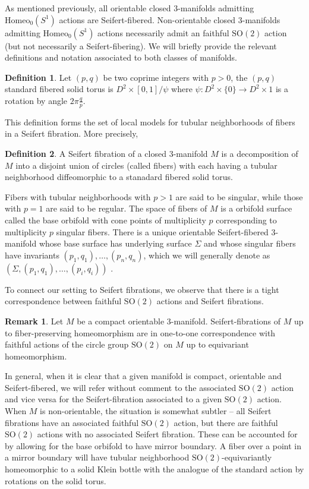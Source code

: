 \documentclass[10pt, oneside]{article}
\newcommand{\SO}[1][2]{\text{SO}(#1)}
\newcommand{\homeo}[1][S^1]{\text{Homeo}_0(#1)}
\theoremstyle{definition}
\newtheorem{defn}{Definition}[section]
\newtheorem{rem}{Remark}[section]
\theoremstyle{definition}
\begin{document}
As mentioned previously, all orientable closed 3-manifolds admitting $\homeo$ actions are Seifert-fibered. Non-orientable closed 3-manifolds admitting $\homeo$ actions necessarily admit an faithful $\SO$ action (but not necessarily a Seifert-fibering). We will briefly provide the relevant definitions and notation associated to both classes of manifolds.

\begin{defn}
    Let $(p, q)$ be two coprime integers with $p>0$, the $(p, q)$ standard fibered solid torus is $D^2\times [0, 1]/\psi$ where $\psi:D^2\times\{0\}\to D^2\times{1}$ is a rotation by angle $2\pi\frac{q}{p}$. 
\end{defn}

This definition forms the set of local models for tubular neighborhoods of fibers in a Seifert fibration. More precisely,

\begin{defn}
    A Seifert fibration of a closed 3-manifold $M$ is a decomposition of $M$ into a disjoint union of circles (called fibers) with each having a tubular neighborhood diffeomorphic to a stanadard fibered solid torus.
\end{defn}

Fibers with tubular neighborhoods with $p>1$ are said to be singular, while those with $p=1$ are said to be regular. The space of fibers of $M$ is a orbifold surface called the base orbifold with cone points of multiplicity $p$ corresponding to multiplicity $p$ singular fibers. There is a unique orientable Seifert-fibered 3-manifold whose base surface has underlying surface $\Sigma$ and whose singular fibers have invariants $(p_1, q_1),\dots,(p_n, q_n)$, which we will generally denote as $(\Sigma, (p_1, q_1),\dots,(p_i,q_i))$ \cite{martelli:IntroductionGeometric}.

To connect our setting to Seifert fibrations, we observe that there is a tight correspondence between faithful $\SO$ actions and Seifert fibrations.

\begin{rem}\label{rem:so2seifequiv}
    Let $M$ be a compact orientable 3-manifold. Seifert-fibrations of $M$ up to fiber-preserving homeomorphism are in one-to-one correspondence with faithful actions of the circle group $\SO$ on $M$ up to equivariant homeomorphism.
\end{rem}

In general, when it is clear that a given manifold is compact, orientable and Seifert-fibered, we will refer without comment to the associated $\SO$ action and vice versa for the Seifert-fibration associated to a given $\SO$ action. When $M$ is non-orientable, the situation is somewhat subtler -- all Seifert fibrations have an associated faithful $\SO$ action, but there are faithful $\SO$ actions with no associated Seifert fibration. These can be accounted for by allowing for the base orbifold to have mirror boundary. A fiber over a point in a mirror boundary will have tubular neighborhood $\SO[2]$-equivariantly homeomorphic to a solid Klein bottle with the analogue of the standard action by rotations on the solid torus.
\end{document}
